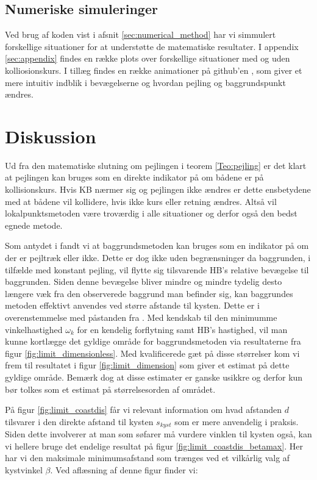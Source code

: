 \documentclass[%
 reprint,
nofootinbib,
aps,
]{revtex4-1}
\begin{document}
\subsection{Numeriske simuleringer}
Ved brug af koden vist i afsnit \ref{sec:numerical_method} har vi simmulert forskellige situationer for at understøtte de matematiske resultater. I appendix \ref{sec:appendix} findes en række plots over forskellige situationer med og uden kolliosionskurs. I tillæg findes en række animationer på github'en \cite{github}, som giver et mere intuitiv indblik i bevægelserne og hvordan pejling og baggrundspunkt ændres.


\section{Diskussion}
Ud fra den matematiske slutning om pejlingen i teorem \ref{Teo:pejling} er det klart at pejlingen kan bruges som en direkte indikator på om bådene er på kollisionskurs. Hvis KB nærmer sig og pejlingen ikke ændres er dette ensbetydene med at bådene vil kollidere, hvis ikke kurs eller retning ændres. Altså vil lokalpunktsmetoden være troværdig i alle situationer og derfor også den bedst egnede metode. \par
Som antydet i \cite{duelighed} fandt vi at baggrundsmetoden kan bruges som en indikator på om der er pejltræk eller ikke. Dette er dog ikke uden begrænsninger da baggrunden, i tilfælde med konstant pejling, vil flytte sig tilsvarende HB's relative bevægelse til baggrunden. Siden denne bevægelse bliver mindre og mindre tydelig desto længere væk fra den observerede baggrund man befinder sig, kan baggrundes metoden effektivt anvendes ved større afstande til kysten. Dette er i overenstemmelse med påstanden fra \cite{duelighed}. Med kendskab til den minimumme vinkelhastighed $\omega_k$ for en kendelig forflytning samt HB's hastighed, vil man kunne kortlægge det gyldige område for baggrundsmetoden via resultaterne fra figur \ref{fig:limit_dimensionless}. Med kvalificerede gæt på disse størrelser kom vi frem til resultatet i figur \ref{fig:limit_dimension} som giver et estimat på dette gyldige område. Bemærk dog at disse estimater er ganske usikkre og derfor kun bør tolkes som et estimat på størrelsesorden af området. \par
På figur \ref{fig:limit_coastdis} får vi relevant information om hvad afstanden $d$ tilsvarer i den direkte afstand til kysten $s_{kyst}$ som er mere anvendelig i praksis. Siden dette involverer at man som søfarer må vurdere vinklen til kysten også, kan vi hellere bruge det endelige resultat på figur \ref{fig:limit_coastdis_betamax}. Her har vi den maksimale minimumsafstand som trænges ved et vilkårlig valg af kystvinkel $\beta$. Ved aflæsning af denne figur finder vi:
\end{document}
